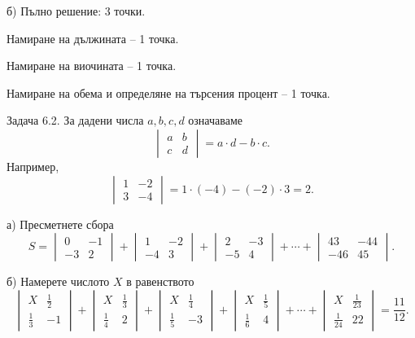 б) Пълно решение: 3 точки.

Намиране на дължината – 1 точка.

Намиране на виочината – 1 точка.

Намиране на обема и определяне на търсения процент – 1 точка.

Задача 6.2. За дадени числа $a,b,c,d$ означаваме
$$
\begin{vmatrix}a&b\\c&d\end{vmatrix}=a\cdot d-b\cdot c.
$$
Например,
$$
\begin{vmatrix}1&-2\\3&-4\end{vmatrix}=1\cdot(-4)-(-2)\cdot3=2.
$$

а) Пресметнете сбора
$$
S=\begin{vmatrix}0&-1\\-3&2\end{vmatrix}+\begin{vmatrix}1&-2\\-4&3\end{vmatrix}+\begin{vmatrix}2&-3\\-5&4\end{vmatrix}+\cdots+\begin{vmatrix}43&-44\\-46&45\end{vmatrix}.
$$

б) Намерете числото $X$ в равенството
$$
\begin{vmatrix}X&\frac12\\\frac13&-1\end{vmatrix}+\begin{vmatrix}X&\frac13\\\frac14&2\end{vmatrix}+\begin{vmatrix}X&\frac14\\\frac15&-3\end{vmatrix}+\begin{vmatrix}X&\frac15\\\frac16&4\end{vmatrix}+\cdots+\begin{vmatrix}X&\frac1{23}\\\frac1{24}&22\end{vmatrix}=\frac{11}{12}.
$$

